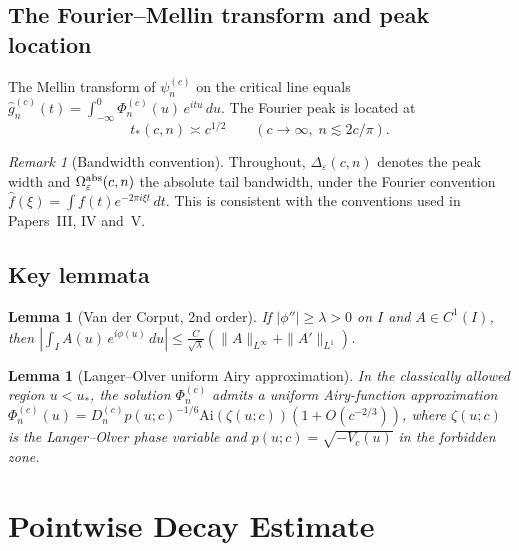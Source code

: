 \documentclass[12pt,a4paper]{amsart}
\newtheorem{lemma}[theorem]{Lemma}
\theoremstyle{definition}
\theoremstyle{remark}
\newtheorem{remark}[theorem]{Remark}
\newcommand{\Ai}{\mathrm{Ai}}
\begin{document}
\subsection{The Fourier--Mellin transform and peak location}

The Mellin transform of $\psi_n^{(c)}$ on the critical line equals
$\widehat{g}_n^{(c)}(t) = \int_{-\infty}^0 \Phi_n^{(c)}(u)\,e^{itu}\,du$.
The Fourier peak is located at
\begin{equation}
\label{eq:peak-location}
t_*(c,n) \asymp c^{1/2}
\qquad (c \to \infty,\; n \lesssim 2c/\pi).
\end{equation}

\begin{remark}[Bandwidth convention]
\label{rem:omega-convention}
Throughout, $\Delta_\varepsilon(c,n)$ denotes the peak width and
$\Omega_\varepsilon^{\rm abs}(c,n)$ the absolute tail bandwidth,
under the Fourier convention
$\hat{f}(\xi) = \int f(t)e^{-2\pi i\xi t}\,dt$.
This is consistent with the conventions used in Papers~III, IV and~V.
\end{remark}

\subsection{Key lemmata}

\begin{lemma}[Van der Corput, 2nd order]
\label{lem:vdC}
If $|\phi''| \ge \lambda > 0$ on $I$ and $A \in C^1(I)$, then
$\left|\int_I A(u)\,e^{i\phi(u)}\,du\right| \le
\frac{C}{\sqrt{\lambda}}(\|A\|_{L^\infty} + \|A'\|_{L^1})$.
\end{lemma}

\begin{lemma}[Langer--Olver uniform Airy approximation]
\label{lem:Langer}
In the classically allowed region $u < u_*$, the solution
$\Phi_n^{(c)}$ admits a uniform Airy-function approximation
$\Phi_n^{(c)}(u) = D_n^{(c)} p(u;c)^{-1/6}\Ai(\zeta(u;c))(1+O(c^{-2/3}))$,
where $\zeta(u;c)$ is the Langer--Olver phase variable and
$p(u;c) = \sqrt{-V_c(u)}$ in the forbidden zone.
\end{lemma}

\section{Pointwise Decay Estimate}
\label{sec:pointwise}
\end{document}
